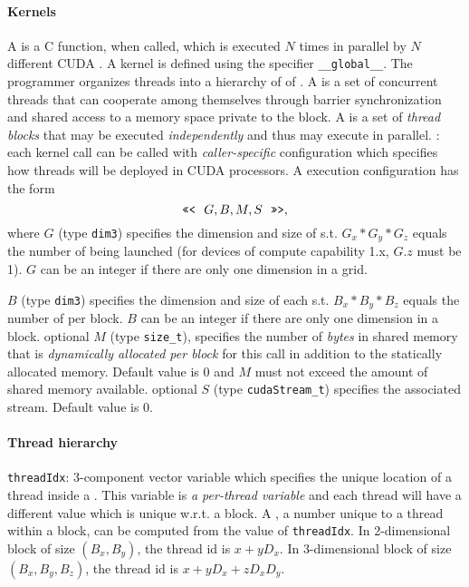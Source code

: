 \documentclass{myart}
\begin{document}
\paragraph{Kernels}
\bit
\w A  is a C function, when called, which is executed $N$ times in
parallel by $N$ different CUDA . A kernel is defined using the
specifier \verb+__global__+. 
\w The programmer organizes threads into a hierarchy of  of
. 
\w A  is a set of concurrent threads that can cooperate among
themselves through barrier synchronization and shared access to a memory space
private to the block.
\w A  is a set of {\em thread blocks\/} that may be executed {\em
  independently\/} and thus may execute in parallel.
\w {}: each kernel call can be called with
{\em caller-specific\/} configuration which specifies how threads will be deployed
in CUDA processors. A execution configuration has the form
   \[ \mbox{\tt <<<}\ \ G, B, M, S\ \ \mbox{\tt >>>}, \]
where 
  \bit
  \w $G$ (type \verb+dim3+) specifies the dimension and size of
   s.t. $G_x * G_y * G_z$ equals the number of  
  being launched (for devices of compute capability 1.x, $G.z$ must be
  1). $G$ can be an integer if there are only one dimension in a grid.
   
  \w $B$ (type \verb+dim3+) specifies the dimension and size of each
   s.t. $B_x * B_y * B_z$ equals the number of 
  per block. $B$ can be an integer if there are only one dimension in a block.
  \w optional $M$ (type \verb+size_t+), specifies the number of {\em
    bytes\/} in shared memory that is {\em dynamically allocated per block\/}
  for this call in addition to the statically allocated memory. Default value
  is 0 and $M$ must not exceed the amount of shared memory available.
  \w optional $S$ (type \verb+cudaStream_t+) specifies the associated
  stream. Default value is 0.
  \eit
\eit

\paragraph{Thread hierarchy}
\bit
\w \verb+threadIdx+: 3-component vector variable
   which specifies the unique location of a thread inside a .
   This variable is {\em a per-thread variable\/} and each thread will have
   a different value which is unique w.r.t. a block.
\w A , a number unique to a thread within a block, can be
computed from the value of \verb+threadIdx+.
  \bit
  \w In 2-dimensional block of size $(B_x, B_y)$, the thread id is $x + yD_x$.
  \w In 3-dimensional block of size $(B_x, B_y, B_z)$, the thread id
  is $x + yD_x + zD_xD_y$.
  \eit
\end{document}

